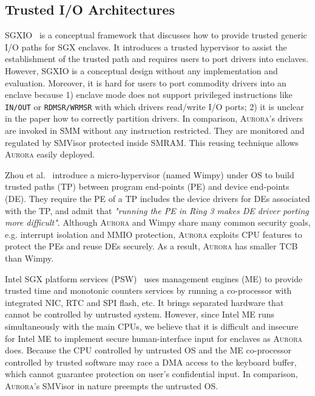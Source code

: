 \subsection{Trusted I/O Architectures}

SGXIO~\cite{weiser_sgxio:_2017} is a conceptual framework that discusses how to provide trusted generic I/O paths for SGX enclaves. It introduces a trusted hypervisor to assist the establishment of the trusted path and requires users to port drivers into enclaves. However, SGXIO is a conceptual design without any implementation and evaluation. Moreover, it is hard for users to port commodity drivers into an enclave because 1) enclave mode does not support privileged instructions like \texttt{IN/OUT} or \texttt{RDMSR/WRMSR} with which drivers read/write I/O ports; 2) it is unclear in the paper \cite{weiser_sgxio:_2017} how to correctly partition drivers. In comparison, \textsc{Aurora}'s drivers are invoked in SMM without any instruction restricted. They are monitored and regulated by SMVisor protected inside SMRAM. This reusing technique allows \textsc{Aurora} easily deployed.

Zhou et al.~\cite{zhou_dancing_2014} introduce a micro-hypervisor (named Wimpy) under OS to build trusted paths (TP) between program end-points (PE) and device end-points (DE). They require the PE of a TP includes the device drivers for DEs associated with the TP, and admit that \textit{"running the PE in Ring 3 makes DE driver porting more difficult"}.  Although \textsc{Aurora} and Wimpy share many common security goals, e.g. interrupt isolation and MMIO protection, \textsc{Aurora} exploits CPU features to protect the PEs and reuse DEs securely. As a result, \textsc{Aurora} has smaller TCB than Wimpy. 

Intel SGX platform services (PSW)~\cite{intel_psw} uses management engines (ME) to provide trusted time and monotonic counters services by running a co-processor with integrated NIC, RTC and SPI flash, etc. It brings separated hardware that cannot be controlled by untrusted system. However, since Intel ME runs simultaneously with the main CPUs, we believe that it is difficult and insecure for Intel ME to implement secure human-interface input for enclaves as \textsc{Aurora} does. Because the CPU controlled by untrusted OS and the ME co-processor controlled by trusted software may race a DMA access  to the keyboard buffer, which cannot guarantee protection on user's confidential input. In comparison, \textsc{Aurora}'s SMVisor in nature preempts the untrusted OS.

